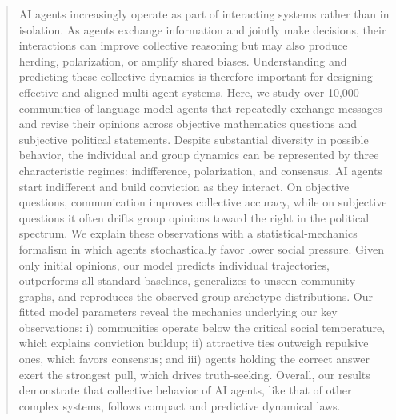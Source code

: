 \begin{abstract}
AI agents increasingly operate as part of interacting systems rather than in isolation. As agents exchange information and jointly make decisions, their interactions can improve collective reasoning but may also produce herding, polarization, or amplify shared biases.
Understanding and predicting these collective dynamics is therefore important for designing effective and aligned multi-agent systems. Here, we study over 10,000 communities of language-model agents that repeatedly exchange messages and revise their opinions across objective mathematics questions and subjective political statements. Despite substantial diversity in possible behavior, the individual and group dynamics can be represented by three characteristic regimes: indifference, polarization, and consensus. AI agents start indifferent and build conviction as they interact. On objective questions, communication improves collective accuracy, while on subjective questions it often drifts group opinions toward the right in the political spectrum. We explain these observations with a statistical-mechanics formalism in which agents stochastically favor lower social pressure. Given only initial opinions, our model predicts individual trajectories, outperforms all standard baselines, generalizes to unseen community graphs, and reproduces the observed group archetype distributions. Our fitted model parameters reveal the mechanics underlying our key observations: i) communities operate below the critical social temperature, which explains conviction buildup; ii) attractive ties outweigh repulsive ones, which favors consensus; and iii) agents holding the correct answer exert the strongest pull, which drives truth-seeking. Overall, our results demonstrate that collective behavior of AI agents, like that of other complex systems, follows compact and predictive dynamical laws.

\end{abstract}

